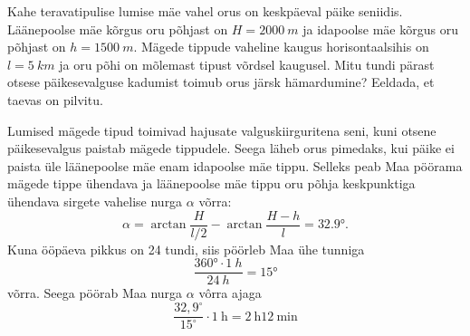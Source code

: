 
Kahe teravatipulise lumise mäe vahel orus on keskpäeval päike seniidis. Läänepoolse mäe kõrgus oru põhjast on $H=\SI{2000}{m}$ ja idapoolse mäe kõrgus oru põhjast on $h=\SI{1500}{m}$. Mägede tippude vaheline kaugus horisontaalsihis on $l=\SI{5}{km}$ ja oru põhi on mõlemast tipust võrdsel kaugusel. Mitu tundi pärast otsese päikesevalguse kadumist toimub orus järsk hämardumine? Eeldada, et taevas on pilvitu.

\hint

\solu
Lumised mägede tipud toimivad hajusate valguskiirguritena seni, kuni otsene päikesevalgus paistab mägede tippudele. Seega läheb orus pimedaks, kui päike ei paista üle läänepoolse mäe enam idapoolse mäe tippu. Selleks peab Maa pöörama mägede tippe ühendava ja läänepoolse mäe tippu oru põhja keskpunktiga ühendava sirgete vahelise nurga $\alpha$ võrra:
$$
\alpha=\arctan \frac{H}{l / 2}-\arctan \frac{H-h}{l}=\ang{32,9}.
$$
Kuna ööpäeva pikkus on 24 tundi, siis pöörleb Maa ühe tunniga
$$
\frac{\ang{360} \cdot \SI{1}{h}}{\SI{24}{h}}=\ang{15}
$$
võrra. Seega pöörab Maa nurga $\alpha$ vôrra ajaga
$$
\frac{32,9^{\circ}}{15^{\circ}} \cdot 1 \mathrm{~h}=2 \mathrm{~h} 12 \mathrm{~min}
$$

\probend